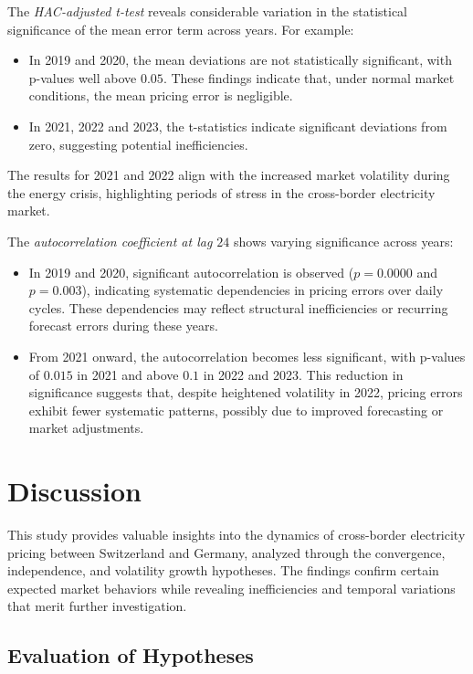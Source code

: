 \documentclass[12pt]{article}
\begin{document}
The \textit{HAC-adjusted t-test} reveals considerable variation in the statistical significance of the mean error term across years. For example:
\begin{itemize}
    \item In 2019 and 2020, the mean deviations are not statistically significant, with p-values well above $0.05$. These findings indicate that, under normal market conditions, the mean pricing error is negligible.
    \item In 2021, 2022 and 2023, the t-statistics indicate significant deviations from zero, suggesting potential inefficiencies.
\end{itemize}
The results for 2021 and 2022 align with the increased market volatility during the energy crisis, highlighting periods of stress in the cross-border electricity market.


The \textit{autocorrelation coefficient at lag $24$} shows varying significance across years:
\begin{itemize}
    \item In 2019 and 2020, significant autocorrelation is observed ($p = 0.0000$ and $p = 0.003$), indicating systematic dependencies in pricing errors over daily cycles. These dependencies may reflect structural inefficiencies or recurring forecast errors during these years.
    \item From 2021 onward, the autocorrelation becomes less significant, with p-values of $0.015$ in 2021 and above $0.1$ in 2022 and 2023. This reduction in significance suggests that, despite heightened volatility in 2022, pricing errors exhibit fewer systematic patterns, possibly due to improved forecasting or market adjustments.
\end{itemize}

\section{Discussion}

This study provides valuable insights into the dynamics of cross-border electricity pricing between Switzerland and Germany, analyzed through the convergence, independence, and volatility growth hypotheses. The findings confirm certain expected market behaviors while revealing inefficiencies and temporal variations that merit further investigation.

\subsection{Evaluation of Hypotheses}
\end{document}
